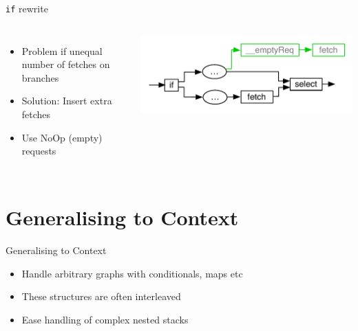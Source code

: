 \documentclass[utf8x,10pt,aspectratio=169]{beamer}
\begin{document}
\begin{frame}{\texttt{if} rewrite}
	\begin{columns}
		\begin{itemize}
			\item Problem if unequal number of fetches on branches
			\item Solution: Insert extra fetches
			\item Use NoOp (empty) requests
		\end{itemize}
		\includegraphics[width=\textwidth]{graphs/insert-empty-fetches-inserted}
	\end{columns}
\end{frame}
\section{Generalising to Context}
\begin{frame}{Generalising to Context}
	\begin{itemize}[<+->]
		\item Handle arbitrary graphs with conditionals, maps etc
		\item These structures are often interleaved
		\item Ease handling of complex nested stacks
	\end{itemize}
\end{frame}
\end{document}
